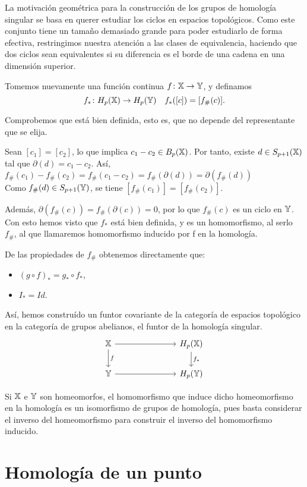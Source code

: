 La motivación geométrica para la construcción de los grupos de homología singular se basa en querer
estudiar los ciclos en espacios topológicos. Como este conjunto tiene un tamaño demasiado grande para
poder estudiarlo de forma efectiva, restringimos nuestra atención a las clases de equivalencia, haciendo
que dos ciclos sean equivalentes si su diferencia es el borde de una cadena en una dimensión superior.

Tomemos nuevamente una función continua $f \colon {\mathbb X} \to {\mathbb Y}$, y definamos
\[ f_* \colon H_p({\mathbb X}) \to H_p({\mathbb Y}) \quad f_*([c]) = [f_\#(c)].  \]

Comprobemos que está bien definida, esto es, que no depende del representante que se elija.

Sean $[c_1] = [c_2]$, lo que implica $c_1 - c_2 \in B_p({\mathbb X})$. Por tanto, existe $d \in S_{p+1}({\mathbb X})$ tal que $\partial(d) = c_1 - c_2$.
Así, $f_\#(c_1) - f_\#(c_2) = f_\#(c_1 - c_2) = f_\#(\partial(d)) = \partial(f_\#(d))$ \\
Como $f_\#(d) \in S_{p+1}({\mathbb Y})$, se tiene $[f_\#(c_1)] = [f_\#(c_2)].$

Además, $\partial(f_\#(c)) = f_\#(\partial(c)) = 0$, por lo que $f_\#(c)$ es un ciclo en ${\mathbb Y}$. Con esto hemos visto que $f_*$ está bien definida,
y es un homomorfismo, al serlo $f_\#$, al que llamaremos homomorfismo inducido por f en la homología.

De las propiedades de $f_\#$ obtenemos directamente que:
\begin{itemize}
  \item $(g \circ f)_* = g_* \circ f_*$,
  \item $I_* = Id$.
\end{itemize}

Así, hemos construído un funtor covariante de la categoría de espacios topológico en la categoría de grupos abelianos,
el funtor de la homología singular.
\[  \begin{tikzcd}
  \X \arrow{r} \arrow{d}{f} & [5em] H_p(\X) \arrow{d}{f_*} \\
  \Y \arrow{r}  & H_p(\Y)
\end{tikzcd} \]

Si ${\mathbb X}$ e ${\mathbb Y}$ son homeomorfos, el homomorfismo que induce dicho homeomorfismo en la homología es un isomorfismo de grupos de homología, pues
basta considerar el inverso del homeomorfismo para construir el inverso del homomorfismo inducido.

\section{Homología de un punto}

